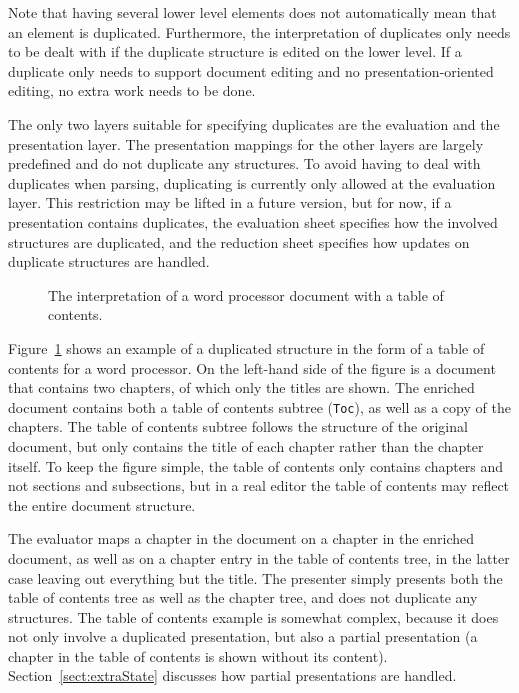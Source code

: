 Note that having several lower level elements does not automatically mean that an element is duplicated. Furthermore, the interpretation of duplicates only needs to be dealt with if the duplicate structure is edited on the lower level. If a duplicate only needs to support document editing and no presentation-oriented editing, no extra work needs to be done.

The only two layers suitable for specifying duplicates are the evaluation and the presentation layer. The presentation mappings for the other layers are largely predefined and do not duplicate any structures. To avoid having to deal with duplicates when parsing, duplicating is currently only allowed at the evaluation layer. This restriction may be lifted in a future version, but for now, if a presentation contains duplicates, the evaluation sheet specifies how the involved structures are duplicated, and the reduction sheet specifies how updates on duplicate structures are handled.

\begin{figure}
\begin{center}
\begin{center}
%
%
\end{center}
\caption{The interpretation of a word processor document with a table of contents.}\label{duplicatesExample} 
\end{center}
\end{figure}

Figure~\ref{duplicatesExample} shows an example of a duplicated structure in the form of a table of contents for a word processor. On the left-hand side of the figure is a document that contains two chapters, of which only the titles are shown. The enriched document contains both a table of contents subtree (\verb|Toc|), as well as a copy of the chapters. The table of contents subtree follows the structure of the original document, but only contains the title of each chapter rather than the chapter itself. To keep the figure simple, the table of contents only contains chapters and not sections and subsections, but in a real editor the table of contents may reflect the entire document structure. 

The evaluator maps a chapter in the document on a chapter in the enriched document, as well as on a chapter entry in the table of contents tree, in the latter case leaving out everything but the title. The presenter simply presents both the table of contents tree as well as the chapter tree, and does not duplicate any structures. The table of contents example is somewhat complex, because it does not only involve a duplicated presentation, but also a partial presentation (a chapter in the table of contents is shown without its content). Section~\ref{sect:extraState} discusses how partial presentations are handled.

